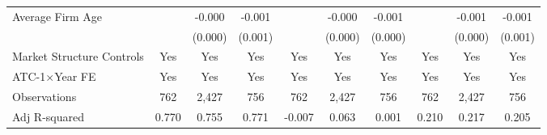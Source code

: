 {\begin{tabular}{l*{9}{c}}
Average Firm Age                        &                     &      -0.000         &      -0.001         &                     &      -0.000         &      -0.001\sym{***}&                     &      -0.001         &      -0.001\sym{*}  \\
                                        &                     &     (0.000)         &     (0.001)         &                     &     (0.000)         &     (0.000)         &                     &     (0.000)         &     (0.001)         \\
\hline
Market Structure Controls               &         Yes         &         Yes         &         Yes         &         Yes         &         Yes         &         Yes         &         Yes         &         Yes         &         Yes         \\
ATC-1$\times$Year FE                    &         Yes         &         Yes         &         Yes         &         Yes         &         Yes         &         Yes         &         Yes         &         Yes         &         Yes         \\
Observations                            &         762         &       2,427         &         756         &         762         &       2,427         &         756         &         762         &       2,427         &         756         \\
Adj R-squared                           &       0.770         &       0.755         &       0.771         &      -0.007         &       0.063         &       0.001         &       0.210         &       0.217         &       0.205         \\
\hline\hline
\end{tabular}
}
